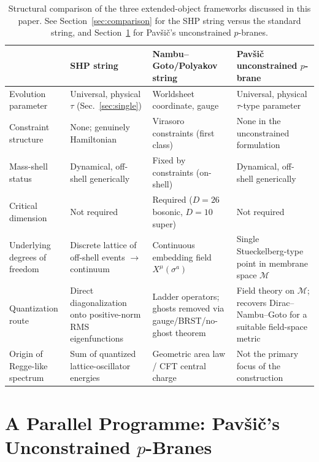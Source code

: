 \documentclass[11pt]{article}
\begin{document}
\begin{table}[htbp]
\centering
\small
\renewcommand{\arraystretch}{1.25}
\begin{tabular}{@{}>{\raggedright\arraybackslash}p{3.1cm}>{\raggedright\arraybackslash}p{3.9cm}>{\raggedright\arraybackslash}p{3.9cm}>{\raggedright\arraybackslash}p{3.9cm}@{}}
\toprule
& \textbf{SHP string} & \textbf{Nambu--Goto/Polyakov string} & \textbf{Pavši\v{c} unconstrained $p$-brane} \\
\midrule
Evolution parameter & Universal, physical $\tau$ (Sec.~\ref{sec:single}) & Worldsheet coordinate, gauge & Universal, physical $\tau$-type parameter \\
Constraint structure & None; genuinely Hamiltonian & Virasoro constraints (first class) & None in the unconstrained formulation \\
Mass-shell status & Dynamical, off-shell generically & Fixed by constraints (on-shell) & Dynamical, off-shell generically \\
Critical dimension & Not required & Required ($D=26$ bosonic, $D=10$ super) & Not required \\
Underlying degrees of freedom & Discrete lattice of off-shell events $\to$ continuum & Continuous embedding field $X^\mu(\sigma^a)$ & Single Stueckelberg-type point in membrane space $\mathcal M$ \\
Quantization route & Direct diagonalization onto positive-norm RMS eigenfunctions & Ladder operators; ghosts removed via gauge/BRST/no-ghost theorem & Field theory on $\mathcal M$; recovers Dirac--Nambu--Goto for a suitable field-space metric \\
Origin of Regge-like spectrum & Sum of quantized lattice-oscillator energies & Geometric area law / CFT central charge & Not the primary focus of the construction \\
\bottomrule
\end{tabular}
\caption{Structural comparison of the three extended-object frameworks
discussed in this paper. See Section~\ref{sec:comparison} for the SHP string
versus the standard string, and Section~\ref{sec:pavsic} for Pavši\v{c}'s
unconstrained $p$-branes.}
\label{tab:comparison}
\end{table}


\section{A Parallel Programme: Pavši\v{c}'s Unconstrained $p$-Branes}
\label{sec:pavsic}
\end{document}
